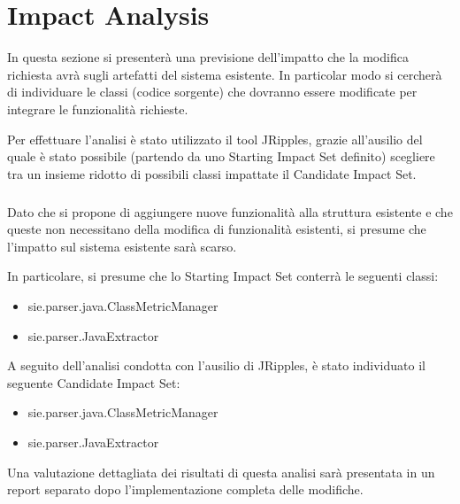 \chapter{Impact Analysis}
In questa sezione si presenterà una previsione dell'impatto che la modifica richiesta avrà sugli artefatti del sistema esistente. In particolar modo si cercherà di individuare le classi (codice sorgente) che dovranno essere modificate per integrare le funzionalità richieste.

Per effettuare l'analisi è stato utilizzato il tool JRipples, grazie all'ausilio del quale è stato possibile (partendo da uno Starting Impact Set definito) scegliere tra un insieme ridotto di possibili classi impattate il Candidate Impact Set.

\paragraph{}
Dato che si propone di aggiungere nuove funzionalità alla struttura esistente e che queste non necessitano della modifica di funzionalità esistenti, si presume che l'impatto sul sistema esistente sarà scarso. 

In particolare, si presume che lo Starting Impact Set conterrà le seguenti classi:
\begin{itemize}
\item sie.parser.java.ClassMetricManager
\item sie.parser.JavaExtractor
\end{itemize}

A seguito dell'analisi condotta con l'ausilio di JRipples, è stato individuato il seguente Candidate Impact Set:
\begin{itemize}
\item sie.parser.java.ClassMetricManager
\item sie.parser.JavaExtractor
\end{itemize}

Una valutazione dettagliata dei risultati di questa analisi sarà presentata in un report separato dopo l'implementazione completa delle modifiche.